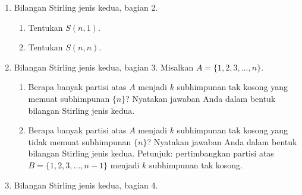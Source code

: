 \begin{enumerate}
\begin{enumerate}
\item \label{exc:recursion-4}Tentukan $S(10,1)$. \hasasolution 
\item Tentukan $S(3,2)$.
\item Tentukan $S(4,3)$.
\item \label{exc:recursion-5}Tentukan $S(4,2)$. \hasasolution 
\item Tentukan $S(8,8)$.
\end{enumerate}
\item \label{exc:recursion-6}\label{enu:Stirling2}Bilangan Stirling jenis
kedua, bagian 2.  \hasasolution 

\begin{enumerate}
\item Tentukan $S(n,1)$.
\item Tentukan $S(n,n)$.
\end{enumerate}
\item \label{exc:recursion-7}\label{enu:Stirling3}Bilangan Stirling jenis
kedua, bagian 3. Misalkan $A=\{1,2,3,\ldots,n\}$. \hasananswer 

\begin{enumerate}
\item Berapa banyak partisi atas $A$ menjadi $k$ subhimpunan tak kosong
yang memuat subhimpunan $\{n\}$? Nyatakan jawaban Anda dalam bentuk
bilangan Stirling jenis kedua.
\item Berapa banyak partisi atas $A$ menjadi $k$ subhimpunan tak kosong
yang tidak memuat subhimpunan $\{n\}$? Nyatakan jawaban Anda dalam
bentuk bilangan Stirling jenis kedua. Petunjuk: pertimbangkan partisi
atas $B=\{1,2,3,\ldots,n-1\}$ menjadi $k$ subhimpunan tak kosong.
\end{enumerate}
\item Bilangan Stirling jenis kedua, bagian 4.


\end{enumerate}
